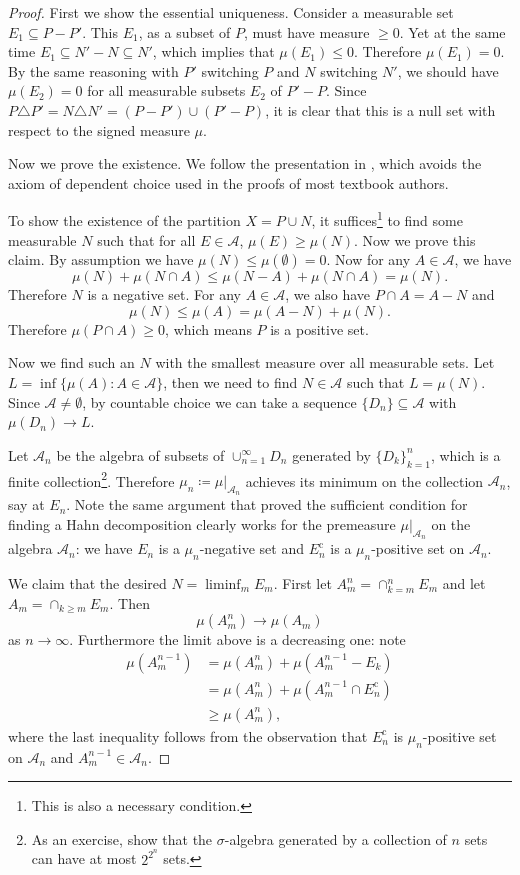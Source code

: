 \documentclass[10pt]{book}
\numberwithin{equation}{chapter}
\theoremstyle{plain-star}
\theoremstyle{definition-star}
\theoremstyle{remark-star}
\theoremstyle{plain-star}
\newcommand{\A}{\mathcal{A}}
\newcommand{\cpl}{\mathrm{c}}
\begin{document}
\begin{proof}
    First we show the essential uniqueness. Consider a measurable set $E_1 \subseteq P - P'$. This $E_1$, as a subset of $P$, must have measure $\geq 0$. Yet at the same time $E_1 \subseteq N' - N\subseteq N'$, which implies that $\mu(E_1)\leq 0$. Therefore $\mu(E_1) = 0$. By the same reasoning with $P'$ switching $P$ and $N$ switching $N'$, we should have $\mu(E_2) = 0$ for all measurable subsets $E_2$ of $P'-P$. Since $P\triangle P' = N \triangle N' = (P - P')\cup(P' - P)$, it is clear that this is a null set with respect to the signed measure $\mu$.

    Now we prove the existence. We follow the presentation in \cite{Falkner_2019}, which avoids the axiom of dependent choice used in the proofs of most textbook authors.

    To show the existence of the partition $X = P \cup N$, it suffices\footnote{This is also a necessary condition.} to find some measurable $N$ such that for all $E \in \A$, $\mu(E)\geq \mu(N)$. Now we prove this claim. By assumption we have $\mu(N)\leq \mu(\emptyset) = 0$. Now for any $A \in \A$, we have \[
        \mu(N) + \mu(N\cap A) \leq \mu(N-A) + \mu(N\cap A) = \mu(N).
    \] Therefore $N$ is a negative set. For any $A \in \A$, we also have $P\cap A = A - N$ and \[
        \mu(N) \leq \mu(A) = \mu(A - N) + \mu(N).
    \] Therefore $\mu(P\cap A)\geq 0$, which means $P$ is a positive set.
    
    Now we find such an $N$ with the smallest measure over all measurable sets. Let $L = \inf\{\mu(A): A\in \A\}$, then we need to find $N \in \A$ such that $L = \mu(N)$. Since $\A \neq \emptyset$, by countable choice we can take a sequence $\{D_n\}\subseteq \A$ with $\mu(D_n)\to L$.

    Let $\A_n$ be the algebra of subsets of $\cup_{n=1}^\infty D_n$ generated by $\{D_k\}_{k=1}^n$, which is a finite collection\footnote{As an exercise, show that the $\sigma$-algebra generated by a collection of $n$ sets can have at most $2^{2^n}$ sets.}. Therefore $\mu_n \coloneqq \mu|_{\A_n}$ achieves its minimum on the collection $\A_n$, say at $E_n$. Note the same argument that proved the sufficient condition for finding a Hahn decomposition clearly works for the premeasure $\mu|_{\A_n}$ on the algebra $\A_n$: we have $E_n$ is a $\mu_n$-negative set and $E_n^\cpl$ is a $\mu_n$-positive set on $\A_n$.

    We claim that the desired $N = \liminf_m E_m$. First let $A_m^n=\cap_{k=m}^n E_m$ and let $A_m = \cap_{k\geq m}E_m$. Then  \[\mu(A_m^n)\to \mu(A_m)\] as $n\to \infty$. Furthermore the limit above is a decreasing one: note \begin{align*}
        \mu(A_m^{n-1}) & = \mu(A_m^n) + \mu(A_m^{n-1} - E_k) \\
        & = \mu(A_m^n) + \mu(A_m^{n-1}\cap E_n^\cpl) \\
        & \geq \mu(A_m^n), 
    \end{align*}
    where the last inequality follows from the observation that $E_n^\cpl$ is $\mu_n$-positive set on $\A_n$ and $A_m^{n-1} \in \A_n$.


\end{proof}
\end{document}

